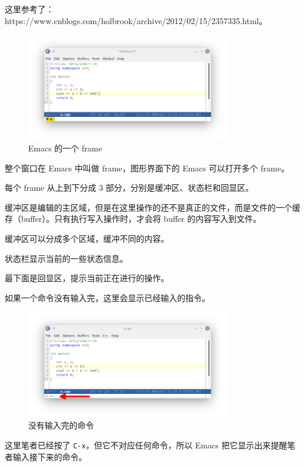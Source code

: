 \documentclass[UTF-8]{ctexart}
\begin{document}
				这里参考了：https://www.cnblogs.com/holbrook/archive/2012/02/15/2357335.html。
				
				\begin{figure}[H]
					\centering
					\includegraphics[width=0.8\textwidth]{fig/emacs_teach_frame.png}
					\caption*{Emacs 的一个 frame}
				\end{figure}
			
				整个窗口在 Emacs 中叫做 frame，图形界面下的 Emacs 可以打开多个 frame。
				
				每个 frame 从上到下分成 3 部分，分别是缓冲区、状态栏和回显区。
				
				缓冲区是编辑的主区域，但是在这里操作的还不是真正的文件，而是文件的一个缓存（buffer）。只有执行写入操作时，才会将 buffer 的内容写入到文件。
				
				缓冲区可以分成多个区域，缓冲不同的内容。
				
				状态栏显示当前的一些状态信息。
				
				最下面是回显区，提示当前正在进行的操作。
				
				如果一个命令没有输入完，这里会显示已经输入的指令。
				
				\begin{figure}[H]
					\centering
					\includegraphics[width=0.8\textwidth]{fig/emacs_teach_c_x.png}
					\caption*{没有输入完的命令}
				\end{figure}
			
				这里笔者已经按了 \texttt{C-x}，但它不对应任何命令，所以 Emacs 把它显示出来提醒笔者输入接下来的命令。
				
\end{document}
